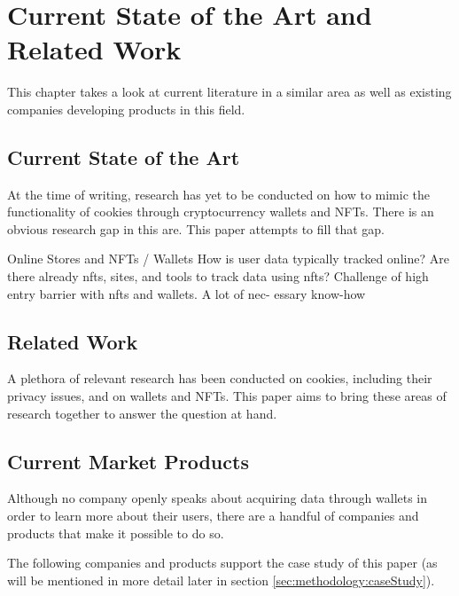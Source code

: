 \chapter{Current State of the Art and Related Work}
\label{ch:SOTA}
This chapter takes a look at current literature in a similar area as well as existing companies developing products in this field.

%
%
\section{Current State of the Art}
\label{sec:sota:stateOfTheArt}
At the time of writing, research has yet to be conducted on how to mimic the functionality of cookies through cryptocurrency wallets and NFTs. There is an obvious research gap in this are. This paper attempts to fill that gap. 

Online Stores and NFTs / Wallets
How is user data typically tracked online? 
Are there already nfts, sites, and tools to track data using nfts? 
Challenge of high entry barrier with nfts and wallets. A lot of nec- essary know-how 


%
%
\section{Related Work}
\label{sec:sota:relatedWork}
A plethora of relevant research has been conducted on cookies, including their privacy issues, and on wallets and NFTs. This paper aims to bring these areas of research together to answer the question at hand.




%
%
\section{Current Market Products}
\label{sec:sota:products}
Although no company openly speaks about acquiring data through wallets in order to learn more about their users, there are a handful of companies and products that make it possible to do so.

The following companies and products support the case study  of this paper (as will be mentioned in more detail later in section \ref{sec:methodology:caseStudy}).

